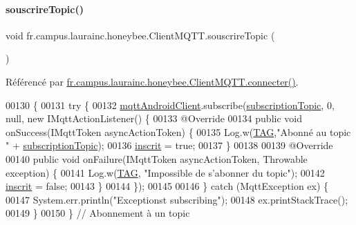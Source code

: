 \paragraph{\texorpdfstring{souscrire\+Topic()}{souscrireTopic()}}
{\footnotesize\ttfamily void fr.\+campus.\+laurainc.\+honeybee.\+Client\+M\+Q\+T\+T.\+souscrire\+Topic (\begin{DoxyParamCaption}{ }\end{DoxyParamCaption})}



Référencé par \hyperlink{classfr_1_1campus_1_1laurainc_1_1honeybee_1_1_client_m_q_t_t_ab514adf6ebb879734ee8f2b3b2fd106a}{fr.\+campus.\+laurainc.\+honeybee.\+Client\+M\+Q\+T\+T.\+connecter()}.


\begin{DoxyCode}
00130                                  \{
00131         \textcolor{keywordflow}{try} \{
00132             \hyperlink{classfr_1_1campus_1_1laurainc_1_1honeybee_1_1_client_m_q_t_t_a587a9b6c785448cf3e37dc92bcac7961}{mqttAndroidClient}.subscribe(\hyperlink{classfr_1_1campus_1_1laurainc_1_1honeybee_1_1_client_m_q_t_t_a8771380740ea2e139b595f5b8fa7e0a5}{subscriptionTopic}, 0, null, \textcolor{keyword}{new} 
      IMqttActionListener() \{
00133                 @Override
00134                 \textcolor{keyword}{public} \textcolor{keywordtype}{void} onSuccess(IMqttToken asyncActionToken) \{
00135                     Log.w(\hyperlink{classfr_1_1campus_1_1laurainc_1_1honeybee_1_1_client_m_q_t_t_a378324f705f8d7870c5f7be0cea02890}{TAG},\textcolor{stringliteral}{"Abonné au topic "} + \hyperlink{classfr_1_1campus_1_1laurainc_1_1honeybee_1_1_client_m_q_t_t_a8771380740ea2e139b595f5b8fa7e0a5}{subscriptionTopic});
00136                     \hyperlink{classfr_1_1campus_1_1laurainc_1_1honeybee_1_1_client_m_q_t_t_a774f2fd702c2a3581bf8dbfa341274fc}{inscrit} = \textcolor{keyword}{true};
00137                 \}
00138 
00139                 @Override
00140                 \textcolor{keyword}{public} \textcolor{keywordtype}{void} onFailure(IMqttToken asyncActionToken, Throwable exception) \{
00141                     Log.w(\hyperlink{classfr_1_1campus_1_1laurainc_1_1honeybee_1_1_client_m_q_t_t_a378324f705f8d7870c5f7be0cea02890}{TAG}, \textcolor{stringliteral}{"Impossible de s'abonner du topic"});
00142                     \hyperlink{classfr_1_1campus_1_1laurainc_1_1honeybee_1_1_client_m_q_t_t_a774f2fd702c2a3581bf8dbfa341274fc}{inscrit} = \textcolor{keyword}{false};
00143                 \}
00144             \});
00145 
00146         \} \textcolor{keywordflow}{catch} (MqttException ex) \{
00147             System.err.println(\textcolor{stringliteral}{"Exceptionst subscribing"});
00148             ex.printStackTrace();
00149         \}
00150     \} \textcolor{comment}{// Abonnement à un topic}
\end{DoxyCode}


